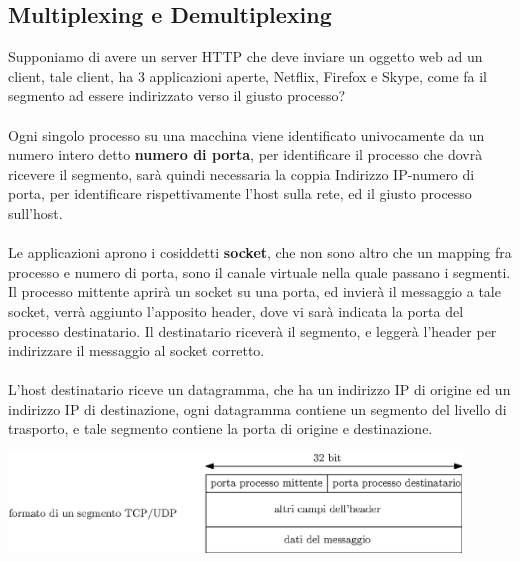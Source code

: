 \documentclass[12pt, letterpaper]{article}
\newcommand{\acc}{\\\hphantom{}\\}
\begin{document}
\subsection{Multiplexing e Demultiplexing}
Supponiamo di avere un server HTTP che deve inviare un oggetto web ad un client, tale client, ha 3 applicazioni 
aperte, Netflix, Firefox e Skype, come fa il segmento ad essere indirizzato verso il giusto processo?\acc 
Ogni singolo processo su una macchina viene identificato univocamente da un numero intero detto \textbf{numero 
di porta}, per identificare il processo che dovrà ricevere il segmento, sarà quindi necessaria 
la coppia Indirizzo IP-numero di porta, per identificare rispettivamente l'host sulla rete, ed il giusto 
processo sull'host.\acc 
Le applicazioni aprono i cosiddetti \textbf{socket}, che non sono altro che un mapping fra 
processo e numero di porta, sono il canale virtuale nella quale passano i segmenti. Il processo 
mittente aprirà un socket su una porta, ed invierà il messaggio a tale socket, verrà aggiunto l'apposito 
header, dove vi sarà indicata la porta del processo destinatario. Il destinatario riceverà il segmento, e leggerà l'header 
per indirizzare il messaggio al socket corretto.\acc 
L'host destinatario riceve un datagramma, che ha un indirizzo IP di origine ed un indirizzo IP di 
destinazione, ogni datagramma contiene un segmento del livello di trasporto, e tale segmento contiene la 
porta di origine e destinazione.\begin{center}
    \includegraphics[width=0.9\textwidth ]{images/segmento.eps}
\end{center}
\end{document}
